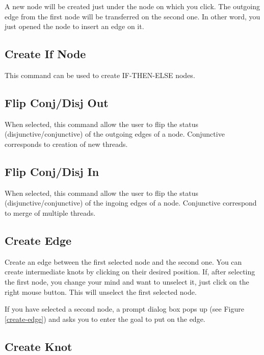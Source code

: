 A new node will be created just under the node on which you click. The outgoing
edge from the first node will be transferred on the second one. In other word,
you just opened the node to insert an edge on it.

\subsection{Create If Node}

This command can be used to create IF-THEN-ELSE nodes.

\subsection{Flip Conj/Disj Out}

When selected, this command allow the user to flip the status
(disjunctive/conjunctive) of the outgoing edges of a node. Conjunctive
corresponds to creation of new threads.

\subsection{Flip Conj/Disj In}

When selected, this command allow the user to flip the status
(disjunctive/conjunctive) of the ingoing edges of a node. Conjunctive
correspond to merge of multiple threads.

\subsection{Create Edge}


Create an edge between the first selected node and the second one.
You can create intermediate knots by clicking on their desired position.
If, after selecting the first node, you change your mind and want to
unselect it, just click on the right mouse button. This will unselect the
first selected node.

If you have selected a second node, a prompt dialog box pops up (see Figure
\ref{create-edge}) and asks you to enter the goal to put on the edge.

\subsection{Create Knot}

